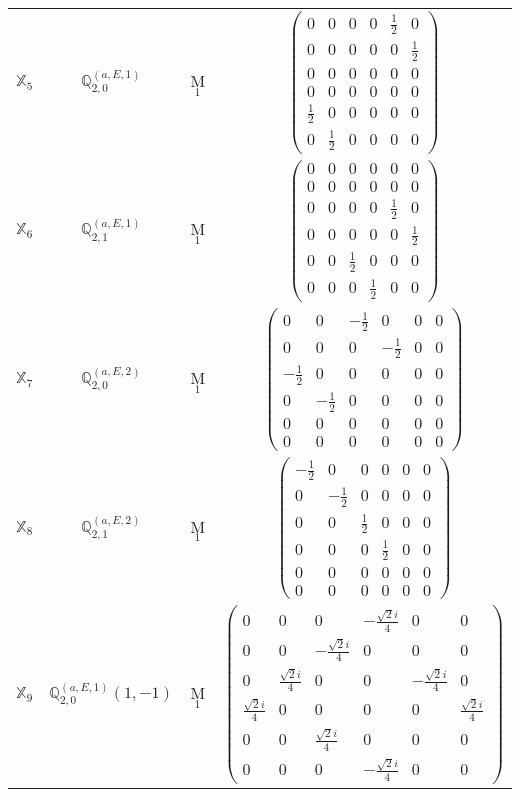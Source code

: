 \documentclass[fleqn,10pt,landscape]{article}
\begin{document}
\begin{itemize}
\begin{center}
\begin{longtable}{c|c|c|c}
$ \mathbb{X}_{5} $ & $\mathbb{Q}_{2,0}^{(a,E,1)}$ & M$_{1}$ & $\begin{pmatrix} 0 & 0 & 0 & 0 & \frac{1}{2} & 0 \\ 0 & 0 & 0 & 0 & 0 & \frac{1}{2} \\ 0 & 0 & 0 & 0 & 0 & 0 \\ 0 & 0 & 0 & 0 & 0 & 0 \\ \frac{1}{2} & 0 & 0 & 0 & 0 & 0 \\ 0 & \frac{1}{2} & 0 & 0 & 0 & 0 \end{pmatrix}$ \\
$ \mathbb{X}_{6} $ & $\mathbb{Q}_{2,1}^{(a,E,1)}$ & M$_{1}$ & $\begin{pmatrix} 0 & 0 & 0 & 0 & 0 & 0 \\ 0 & 0 & 0 & 0 & 0 & 0 \\ 0 & 0 & 0 & 0 & \frac{1}{2} & 0 \\ 0 & 0 & 0 & 0 & 0 & \frac{1}{2} \\ 0 & 0 & \frac{1}{2} & 0 & 0 & 0 \\ 0 & 0 & 0 & \frac{1}{2} & 0 & 0 \end{pmatrix}$ \\
$ \mathbb{X}_{7} $ & $\mathbb{Q}_{2,0}^{(a,E,2)}$ & M$_{1}$ & $\begin{pmatrix} 0 & 0 & - \frac{1}{2} & 0 & 0 & 0 \\ 0 & 0 & 0 & - \frac{1}{2} & 0 & 0 \\ - \frac{1}{2} & 0 & 0 & 0 & 0 & 0 \\ 0 & - \frac{1}{2} & 0 & 0 & 0 & 0 \\ 0 & 0 & 0 & 0 & 0 & 0 \\ 0 & 0 & 0 & 0 & 0 & 0 \end{pmatrix}$ \\
$ \mathbb{X}_{8} $ & $\mathbb{Q}_{2,1}^{(a,E,2)}$ & M$_{1}$ & $\begin{pmatrix} - \frac{1}{2} & 0 & 0 & 0 & 0 & 0 \\ 0 & - \frac{1}{2} & 0 & 0 & 0 & 0 \\ 0 & 0 & \frac{1}{2} & 0 & 0 & 0 \\ 0 & 0 & 0 & \frac{1}{2} & 0 & 0 \\ 0 & 0 & 0 & 0 & 0 & 0 \\ 0 & 0 & 0 & 0 & 0 & 0 \end{pmatrix}$ \\
$ \mathbb{X}_{9} $ & $\mathbb{Q}_{2,0}^{(a,E,1)}(1,-1)$ & M$_{1}$ & $\begin{pmatrix} 0 & 0 & 0 & - \frac{\sqrt{2} i}{4} & 0 & 0 \\ 0 & 0 & - \frac{\sqrt{2} i}{4} & 0 & 0 & 0 \\ 0 & \frac{\sqrt{2} i}{4} & 0 & 0 & - \frac{\sqrt{2} i}{4} & 0 \\ \frac{\sqrt{2} i}{4} & 0 & 0 & 0 & 0 & \frac{\sqrt{2} i}{4} \\ 0 & 0 & \frac{\sqrt{2} i}{4} & 0 & 0 & 0 \\ 0 & 0 & 0 & - \frac{\sqrt{2} i}{4} & 0 & 0 \end{pmatrix}$ \\

\end{longtable}
\end{center}
\end{itemize}
\end{document}
